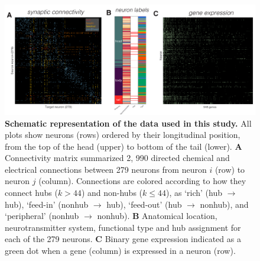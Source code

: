 \documentclass[10pt,letterpaper]{article}
\begin{document}
\begin{figure}[h]
  \centering
    \includegraphics[width=1\textwidth]{SchematicIndicators.pdf}
 \caption{\textbf{Schematic representation of the data used in this study.}
All plots show neurons (rows) ordered by their longitudinal position, from the top of the head (upper) to bottom of the tail (lower).
 \textbf{A} Connectivity matrix summarized 2, 990 directed chemical and electrical connections between 279 neurons from neuron $i$ (row) to neuron $j$ (column).
Connections are colored according to how they connect hubs ($k > 44$) and non-hubs ($k \leq 44$), as `rich' (hub $\rightarrow$ hub), `feed-in' (nonhub $\rightarrow$ hub), `feed-out' (hub $\rightarrow$ nonhub), and `peripheral' (nonhub $\rightarrow$ nonhub).
  \textbf{B} Anatomical location, neurotransmitter system, functional type and hub assignment for each of the 279 neurons.
 \textbf{C} Binary gene expression indicated as a green dot when a gene (column) is expressed in a neuron (row).
}
\label{fig:SchematicRepresentation}
\end{figure}
\end{document}
